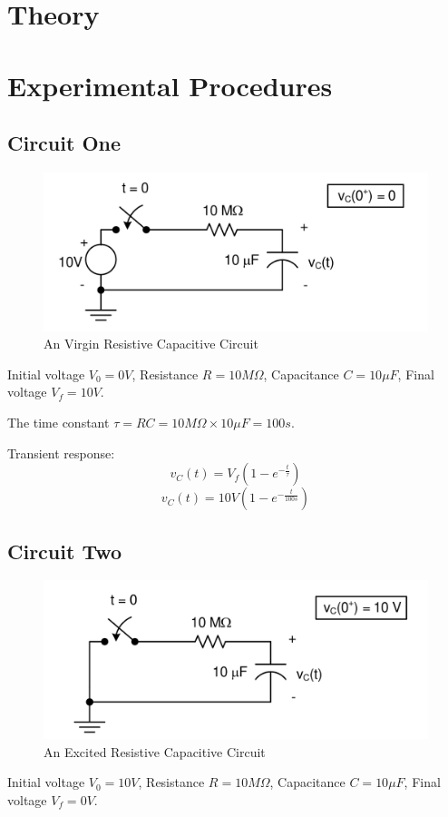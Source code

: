 \documentclass[12pt]{article}
\begin{document}
\section{Theory}
\section{Experimental Procedures}
\subsection{Circuit One}

\begin{figure}[H]
	\centering
	\includegraphics[width=14cm]{e5_1}
	\caption{An Virgin Resistive Capacitive Circuit}
\end{figure}
Initial voltage $V_0 = 0V$, Resistance $R = 10M\Omega$, Capacitance $C = 10\mu F$, Final voltage $V_f = 10V$.

The time constant $\tau = RC = 10M\Omega \times 10\mu F = 100s$.

Transient response:
\[
	v_C(t) = V_f (1 - e^{-\frac{t}{\tau}})
\]
\[
	v_C(t) = 10V (1 - e^{-\frac{t}{100s}})
\]
\subsection{Circuit Two}

\begin{figure}[H]
	\centering
	\includegraphics[width=14cm]{e5_2}
	\caption{An Excited Resistive Capacitive Circuit}
\end{figure}
Initial voltage $V_0 = 10V$, Resistance $R = 10M\Omega$, Capacitance $C = 10\mu F$, Final voltage $V_f = 0V$.
\end{document}
